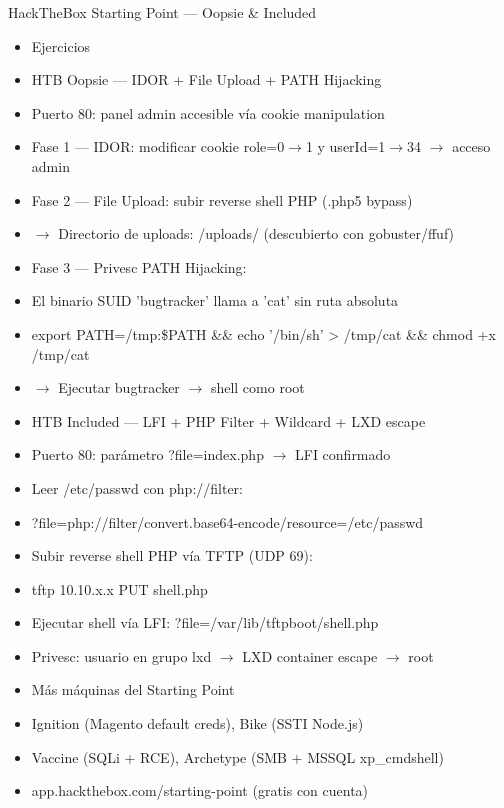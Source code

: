 \documentclass[aspectratio=169,10pt]{beamer}
\begin{document}
\begin{frame}[allowframebreaks]{HackTheBox Starting Point --- Oopsie \& Included}
\small
  \begin{itemize}
  \item Ejercicios
  \item HTB Oopsie --- IDOR + File Upload + PATH Hijacking
  \item Puerto 80: panel admin accesible vía cookie manipulation
  \item Fase 1 --- IDOR: modificar cookie role=0$\rightarrow$1 y userId=1$\rightarrow$34 $\rightarrow$ acceso admin
  \item Fase 2 --- File Upload: subir reverse shell PHP (.php5 bypass)
  \item $\rightarrow$ Directorio de uploads: /uploads/ (descubierto con gobuster/ffuf)
  \item Fase 3 --- Privesc PATH Hijacking:
  \item El binario SUID 'bugtracker' llama a 'cat' sin ruta absoluta
  \item export PATH=/tmp:\$PATH \&\& echo '/bin/sh' \textgreater{} /tmp/cat \&\& chmod +x /tmp/cat
  \item $\rightarrow$ Ejecutar bugtracker $\rightarrow$ shell como root
  \item HTB Included --- LFI + PHP Filter + Wildcard + LXD escape
  \item Puerto 80: parámetro ?file=index.php $\rightarrow$ LFI confirmado
  \item Leer /etc/passwd con php://filter:
  \item ?file=php://filter/convert.base64-encode/resource=/etc/passwd
  \item Subir reverse shell PHP vía TFTP (UDP 69):
  \item tftp 10.10.x.x PUT shell.php
  \item Ejecutar shell vía LFI: ?file=/var/lib/tftpboot/shell.php
  \item Privesc: usuario en grupo lxd $\rightarrow$ LXD container escape $\rightarrow$ root
  \item Más máquinas del Starting Point
  \item Ignition (Magento default creds), Bike (SSTI Node.js)
  \item Vaccine (SQLi + RCE), Archetype (SMB + MSSQL xp\_cmdshell)
  \item app.hackthebox.com/starting-point (gratis con cuenta)
  \end{itemize}
\end{frame}
\end{document}
